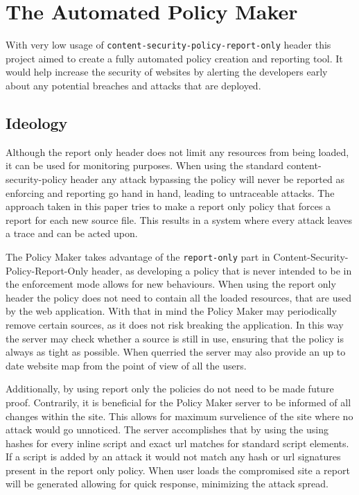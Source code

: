 \chapter{The Automated Policy Maker}

With very low usage of \texttt{content-security-policy-report-only} header this project aimed to create a fully automated policy creation and reporting tool.
It would help increase the security of websites by alerting the developers early about any potential breaches and attacks that are deployed.

\section{Ideology}

Although the report only header does not limit any resources from being loaded, it can be used for monitoring purposes.
When using the standard content-security-policy header any attack bypassing the policy will never be reported as enforcing and reporting go hand in hand, leading to untraceable attacks.
The approach taken in this paper tries to make a report only policy that forces a report for each new source file.
This results in a system where every attack leaves a trace and can be acted upon.

The Policy Maker takes advantage of the \texttt{report-only} part in Content-Security-Policy-Report-Only header, as developing a policy that is never intended to be in the enforcement mode allows for new behaviours.
When using the report only header the policy does not need to contain all the loaded resources, that are used by the web application.
With that in mind the Policy Maker may periodically remove certain sources, as it does not risk breaking the application.
In this way the server may check whether a source is still in use, ensuring that the policy is always as tight as possible. 
When querried the server may also provide an up to date website map from the point of view of all the users.

Additionally, by using report only the policies do not need to be made future proof. 
Contrarily, it is beneficial for the Policy Maker server to be informed of all changes within the site.
This allows for maximum survelience of the site where no attack would go unnoticed.
The server accomplishes that by using the using hashes for every inline script and exact url matches for standard script elements.
If a script is added by an attack it would not match any hash or url signatures present in the report only policy.
When user loads the compromised site a report will be generated allowing for quick response, minimizing the attack spread.

